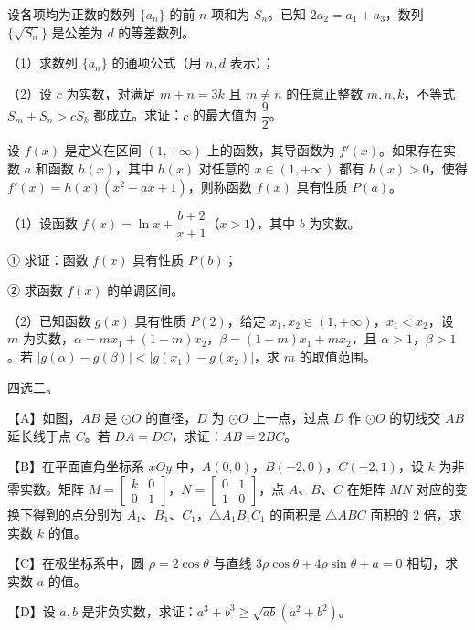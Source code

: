\endgroup
\begin{question}
设各项均为正数的数列 $\{a_n\}$ 的前 $n$ 项和为 $S_n$。已知 $2a_2=a_1+a_3$，数列 $\{\sqrt{S_n}\}$ 是公差为 $d$ 的等差数列。

（1）求数列 $\{a_n\}$ 的通项公式（用 $n,d$ 表示）；

（2）设 $c$ 为实数，对满足 $m+n=3k$ 且 $m\neq n$ 的任意正整数 $m,n,k$，不等式 $S_m+S_n>cS_k$ 都成立。求证：$c$ 的最大值为 $\dfrac92$。

\end{question}
\begin{question}
设 $f(x)$ 是定义在区间 $(1,+\infty)$ 上的函数，其导函数为 $f'(x)$。如果存在实数 $a$ 和函数 $h(x)$，其中 $h(x)$ 对任意的 $x\in(1,+\infty)$ 都有 $h(x)>0$，使得 $f'(x)=h(x)(x^2-ax+1)$，则称函数 $f(x)$ 具有性质 $P(a)$。

（1）设函数 $f(x)=\ln x+\dfrac{b+2}{x+1}$（$x>1$），其中 $b$ 为实数。

① 求证：函数 $f(x)$ 具有性质 $P(b)$；

② 求函数 $f(x)$ 的单调区间。

（2）已知函数 $g(x)$ 具有性质 $P(2)$，给定 $x_1,x_2\in(1,+\infty)$，$x_1<x_2$，设 $m$ 为实数，$\alpha=mx_1+(1-m)x_2$，$\beta=(1-m)x_1+mx_2$，且 $\alpha>1$，$\beta>1$。若 $|g(\alpha)-g(\beta)|<|g(x_1)-g(x_2)|$，求 $m$ 的取值范围。

\Needspace{0.4\textheight}
\end{question}
\begingroup
\renewenvironment{question}{\Needspace{0.5\textheight}}{}
\begin{question}
四选二。

【A】如图，$AB$ 是 $\odot O$ 的直径，$D$ 为 $\odot O$ 上一点，过点 $D$ 作 $\odot O$ 的切线交 $AB$ 延长线于点 $C$。若 $DA=DC$，求证：$AB=2BC$。
\nopagebreak[4]
\begin{center}\end{center}
\nopagebreak[4]
【B】在平面直角坐标系 $xOy$ 中，$A(0,0)$，$B(-2,0)$，$C(-2,1)$，设 $k$ 为非零实数。矩阵 $M=\begin{bmatrix}k&0\\0&1\end{bmatrix}$，$N=\begin{bmatrix}0&1\\1&0\end{bmatrix}$，点 $A$、$B$、$C$ 在矩阵 $MN$ 对应的变换下得到的点分别为 $A_1$、$B_1$、$C_1$，$\triangle A_1B_1C_1$ 的面积是 $\triangle ABC$ 面积的 $2$ 倍，求实数 $k$ 的值。

【C】在极坐标系中，圆 $\rho=2\cos\theta$ 与直线 $3\rho\cos\theta+4\rho\sin\theta+a=0$ 相切，求实数 $a$ 的值。

【D】设 $a,b$ 是非负实数，求证：$a^3+b^3\geqslant\sqrt{ab}(a^2+b^2)$。

\end{question}
